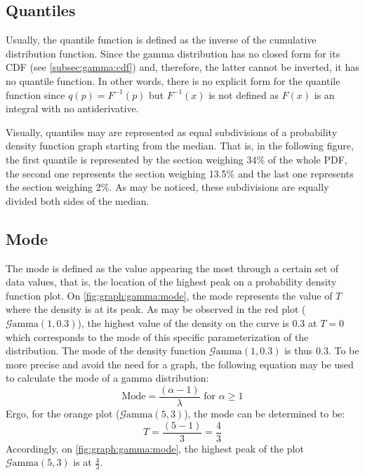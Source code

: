 \documentclass[12pt]{article}
\newcommand{\G}{\mathcal{G}}
\begin{document}
\pagebreak
\subsection{Quantiles}
Usually, the quantile function is defined as the inverse of the cumulative distribution function. Since the gamma
distribution has no closed form for its CDF (see \autoref{subsec:gamma:cdf}) and, therefore, the latter cannot be
inverted, it has no quantile function. In other words, there is no explicit form for the quantile function since
$q(p)=F^{-1}(p)$ but $F^{-1}(x)$ is not defined as $F(x)$ is an integral with no antiderivative.

Visually, quantiles may are represented as equal subdivisions of a probability density function graph starting from the
median. That is, in the following figure, the first quantile is represented by the section weighing 34\% of the whole
PDF, the second one represents the section weighing 13.5\% and the last one represents the section weighing 2\%. As may
be noticed, these subdivisions are equally divided both sides of the median.



\pagebreak
\subsection{Mode}
The mode is defined as the value appearing the most through a certain set of data values, that is, the location of the
highest peak on a probability density function plot. On \autoref{fig:graph:gamma:mode}, the mode represents the value of
$T$ where the density is at its peak.
As may be observed in the red plot ($\G\text{amma}(1, 0.3)$), the highest value of the density on the curve is $0.3$ at
$T=0$ which corresponds to the mode of this specific parameterization of the distribution. The mode of the density
function $\G\text{amma}(1, 0.3)$ is thus $0.3$. To be more precise and avoid the need for a graph, the following
equation may be used to calculate the mode of a gamma distribution:
\begin{equation}\label{eq:gamma:mode}
	\text{Mode} = \frac{(\alpha-1)}{\lambda}\text{ for }\alpha \geq 1
\end{equation}
Ergo, for the orange plot ($\G\text{amma}(5, 3)$), the mode can be determined to be:
\begin{equation}
	T = \frac{(5-1)}{3} = \frac{4}{3}
\end{equation}
Accordingly, on \autoref{fig:graph:gamma:mode}, the highest peak of the plot $\G\text{amma}(5, 3)$ is at $\frac{4}{3}$.
\end{document}
